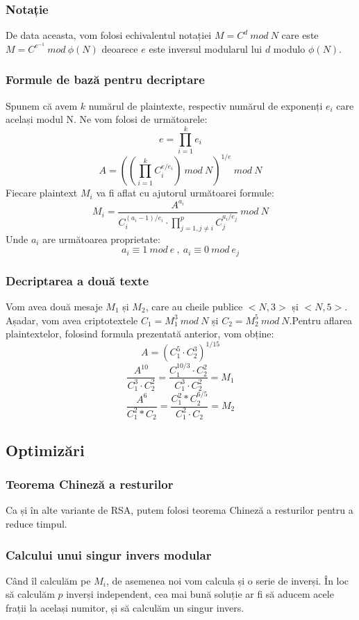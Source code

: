 \documentclass[12pt, oneside]{book}
\begin{document}
		  \subsubsection{Notație}
		  De data aceasta, vom folosi echivalentul notației $M=C^d \ mod \ N$ care este $M=C^{e^{
		  -1}} \ mod \ \phi(N)$ deoarece $e$ este inversul modularul lui $d$ modulo $\phi(N)$.
		  
		  \subsubsection{Formule de bază pentru decriptare}
		  Spunem că avem $k$ numărul de plaintexte, respectiv numărul de exponenți $e_i$ care același modul N. Ne vom folosi de următoarele:
		  $$ e= \prod_{i=1}^{k}e_i$$
		  $$ A =\left( \left(\prod_{i=1}^{k} C_{i}^{e/e_i} \right) \ mod \ N \right)^{1/e} \ mod \ N$$
		  Fiecare plaintext $M_i$ va fi aflat cu ajutorul următoarei formule:
		  $$ M_i = \frac{A^{a_i}}{C_{i}^{(a_i-1)/e_i} \cdot   \prod_{j=1,j \neq i }^{p } C_{j}^{a_i/e_j }                                 } \ mod \ N$$ 	
		  Unde $a_i$ are următoarea proprietate:
		  $$a_i \equiv 1 \ mod \ e \ , \ a_i \equiv 0 \ mod \ e_j$$	  
		  
		  \subsubsection{Decriptarea a două texte}
		  Vom avea două mesaje $M_1$ și $M_2$, care au cheile publice $<N,3>$ și $<N,5>$. Așadar, vom avea criptotextele $C_1 = M_{1}^{3} \ mod \ N$ și $C_2 = M_{2}^{5} \ mod \ N$.Pentru aflarea plaintextelor, folosind formula prezentată anterior, vom obține:
		  $$ A=(C_{1}^{5} \cdot   C_{2}^{3})^{1/15} $$
		  $$\frac{A^{10}}{C_{1}^{3} \cdot   C_{2}^{2}} = \frac{C_{1}^{10/3} \cdot   C_{2}^{2}}{C_{1}^{3} \cdot   C_{2}^{2} }=M_1$$
		  $$\frac{A^6}{C_{1}^{2} *C_{2}}=\frac{C_{1}^{2} *C_{2}^{6/5}}{C_{1}^{2} \cdot   C_{2}}=M_2 $$
		  
		  \subsection{Optimizări}
		  \subsubsection{Teorema Chineză a resturilor}
		  Ca și în alte variante de RSA, putem folosi teorema Chineză a resturilor pentru a reduce timpul.
		  \subsubsection{Calcului unui singur invers modular}
		  Când îl calculăm pe $M_i$, de asemenea noi vom calcula și o serie de inverși. În loc să calculăm $p$ inverși independent, cea mai bună soluție ar fi să aducem acele frații la același numitor, și să calculăm un singur invers.
\end{document}

